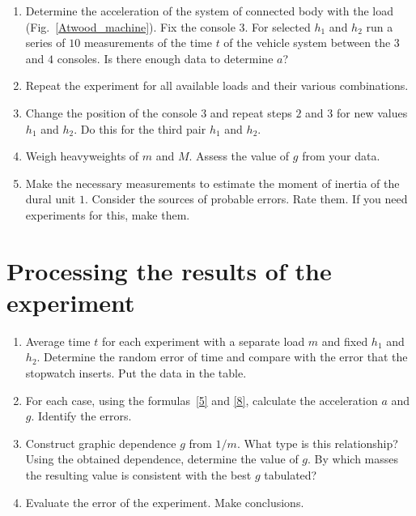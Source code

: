 \documentclass{LabWorkEng}
\begin{document}
\begin{enumerate}
	\item Determine the acceleration of the system of connected body with the load (Fig.~\ref{Atwood_machine}). Fix the console $3$. For selected $h_1$ and $h_2$ run a series of $10$ measurements of the time $t$ of the vehicle system between the $3$ and $4$ consoles. Is there enough data to determine $a$?
	\item Repeat the experiment for all available loads and their various combinations.
	\item Change the position of the console $3$ and repeat steps $2$ and $3$ for new values $h_1$ and $h_2$. Do this for the third pair $h_1$ and $h_2$.
	\item Weigh heavyweights of $m$ and $M$. Assess the value of $g$ from your data.
	\item Make the necessary measurements to estimate the moment of inertia of the dural unit $1$. Consider the sources of probable errors. Rate them. If you need experiments for this, make them.
\end{enumerate}

\section{Processing the results of the experiment}

\begin{enumerate}
	\item Average time $t$ for each experiment with a separate load $m$ and fixed $h_1$ and $h_2$. Determine the random error of time and compare with the error that the stopwatch inserts. Put the data in the table.
	\item For each case, using the formulas~\eqref{5} and \eqref{8}, calculate the acceleration $a$ and $g$. Identify the errors.
	\item Construct graphic dependence $g$ from $1/m$. What type is this relationship? Using the obtained dependence, determine the value of $g$. By which masses the resulting value is consistent with the best $g$ tabulated? %
	\item Evaluate the error of the experiment. Make conclusions.
\end{enumerate}
\end{document}
